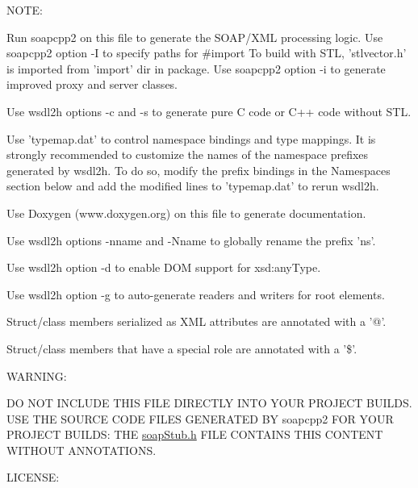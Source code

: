 NOTE:


\begin{DoxyItemize}
\item Run soapcpp2 on this file to generate the SOAP/XML processing logic. Use soapcpp2 option -\/I to specify paths for \#import To build with STL, 'stlvector.h' is imported from 'import' dir in package. Use soapcpp2 option -\/i to generate improved proxy and server classes.
\item Use wsdl2h options -\/c and -\/s to generate pure C code or C++ code without STL.
\item Use 'typemap.dat' to control namespace bindings and type mappings. It is strongly recommended to customize the names of the namespace prefixes generated by wsdl2h. To do so, modify the prefix bindings in the Namespaces section below and add the modified lines to 'typemap.dat' to rerun wsdl2h.
\item Use Doxygen (www.doxygen.org) on this file to generate documentation.
\item Use wsdl2h options -\/nname and -\/Nname to globally rename the prefix 'ns'.
\item Use wsdl2h option -\/d to enable DOM support for xsd:anyType.
\item Use wsdl2h option -\/g to auto-\/generate readers and writers for root elements.
\item Struct/class members serialized as XML attributes are annotated with a '@'.
\item Struct/class members that have a special role are annotated with a '\$'.
\end{DoxyItemize}

WARNING:

DO NOT INCLUDE THIS FILE DIRECTLY INTO YOUR PROJECT BUILDS. USE THE SOURCE CODE FILES GENERATED BY soapcpp2 FOR YOUR PROJECT BUILDS: THE \hyperlink{soapStub_8h_source}{soapStub.h} FILE CONTAINS THIS CONTENT WITHOUT ANNOTATIONS.

LICENSE:

